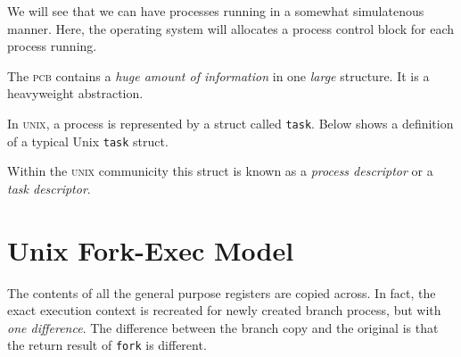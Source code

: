 We will see that we can have processes running in a somewhat simulatenous manner.
Here, the operating system will allocates 
a process control block for each process running. 


The \textsc{pcb} contains a \textit{huge amount of information} in
one \textit{large} structure. It is a heavyweight abstraction.


\begin{example}
In \textsc{unix}, a process is represented by a struct called \lstinline{task}. 
Below shows a definition of a typical Unix \lstinline{task} struct.  
\end{example}

Within the \textsc{unix} communicity this struct is known as a \textit{process descriptor}
or a \textit{task descriptor}.







\section{Unix Fork-Exec Model}



The contents of all the general purpose registers are copied across. 
In fact, the exact execution context is recreated for newly created branch process, 
but with \textit{one difference}. 
The difference between the branch copy and the original is
that the return result of \lstinline{fork} is different.

\begin{figure}[h]
\end{figure}

